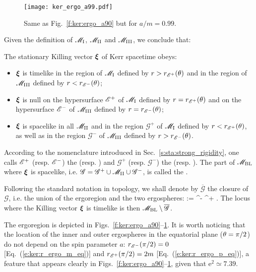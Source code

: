 \begin{figure}
\centerline{\texttt{[image: ker\_ergo\_a99.pdf]}}
\caption[]{\label{f:ker:ergo_a99} \footnotesize
Same as Fig.~\ref{f:ker:ergo_a90} but for $a/m=0.99$.
}
\end{figure}

Given the definition of $\mathscr{M}_{\rm I}$, $\mathscr{M}_{\rm II}$ and $\mathscr{M}_{\rm III}$, we conclude that:

\begin{prop}
The stationary Killing vector $\bm{\xi}$ of Kerr spacetime obeys:
\begin{itemize}
\item $\bm{\xi}$ is timelike in the region of $\mathscr{M}_{\rm I}$ defined by $r>r_{\mathscr{E}^+}(\theta)$
and in the region of $\mathscr{M}_{\rm III}$ defined by $r<r_{\mathscr{E}^-}(\theta)$;
\item $\bm{\xi}$ is null on the hypersurface $\mathscr{E}^+$ of $\mathscr{M}_{\rm I}$ defined by
$r=r_{\mathscr{E}^+}(\theta)$
and on the hypersurface $\mathscr{E}^-$ of $\mathscr{M}_{\rm III}$ defined by $r=r_{\mathscr{E}^-}(\theta)$;
\item $\bm{\xi}$ is spacelike in all $\mathscr{M}_{\rm II}$ and in the region
$\mathscr{G}^+$ of $\mathscr{M}_{\rm I}$
defined by $r<r_{\mathscr{E}^+}(\theta)$, as well as
in the region $\mathscr{G}^-$ of $\mathscr{M}_{\rm III}$ defined by $r>r_{\mathscr{E}^-}(\theta)$.
\end{itemize}
According to the nomenclature introduced in Sec.~\ref{s:sta:strong_rigidity},
one calls $\mathscr{E}^+$ (resp. $\mathscr{E}^-$) the
(resp. )
and $\mathscr{G}^+$ (resp. $\mathscr{G}^-$) the
(resp. ).
The part of $\mathscr{M}_{\rm BL}$ where $\bm{\xi}$ is spacelike, i.e.
$\mathscr{G} = \mathscr{G}^+ \cup \mathscr{M}_{\rm II} \cup \mathscr{G}^-$,
is called the .
\end{prop}


Following the standard notation in topology, we shall denote
by $\overline{\mathscr{G}}$ the closure of $\mathscr{G}$, i.e. the
union of the ergoregion and the two ergospheres:
\be
     :=  \cup \E^- \cup \E^+ .
\ee
The locus where the Killing vector $\bm{\xi}$ is timelike is then
$\mathscr{M}_{\rm BL}\setminus \overline{\mathscr{G}}$.

The ergoregion is depicted in Figs.~\ref{f:ker:ergo_a90}--\ref{f:ker:ergo_a99}.
It is worth noticing that
the location of the inner and outer ergospheres in the equatorial
plane ($\theta=\pi/2$) do not depend on the spin parameter $a$:
$r_{\mathscr{E}^-}(\pi/2) = 0$ [Eq.~(\ref{e:ker:r_ergo_m_eq})] and
$r_{\mathscr{E}^+}(\pi/2) = 2m$ [Eq.~(\ref{e:ker:r_ergo_p_eq})], a feature
that appears clearly in Figs.~\ref{f:ker:ergo_a90}--\ref{f:ker:ergo_a99},
given that $\mathrm{e}^2 \simeq 7.39$.

